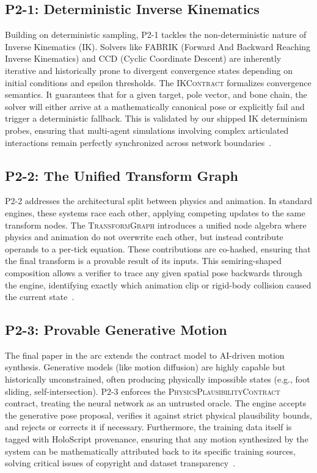 \documentclass[sigconf,nonacm]{acmart}
\newcommand{\ikcontract}{\textsc{IKContract}}
\newcommand{\transformgraph}{\textsc{TransformGraph}}
\newcommand{\plausibility}{\textsc{PhysicsPlausibilityContract}}
\begin{document}
\subsection{P2-1: Deterministic Inverse Kinematics}
Building on deterministic sampling, P2-1 tackles the non-deterministic nature of Inverse Kinematics (IK). Solvers like FABRIK (Forward And Backward Reaching Inverse Kinematics) and CCD (Cyclic Coordinate Descent) are inherently iterative and historically prone to divergent convergence states depending on initial conditions and epsilon thresholds. The \ikcontract{} formalizes convergence semantics. It guarantees that for a given target, pole vector, and bone chain, the solver will either arrive at a mathematically canonical pose or explicitly fail and trigger a deterministic fallback. This is validated by our shipped IK determinism probes, ensuring that multi-agent simulations involving complex articulated interactions remain perfectly synchronized across network boundaries~\cite{paper-7-ik-siggraph2027}.

\subsection{P2-2: The Unified Transform Graph}
P2-2 addresses the architectural split between physics and animation. In standard engines, these systems race each other, applying competing updates to the same transform nodes. The \transformgraph{} introduces a unified node algebra where physics and animation do not overwrite each other, but instead contribute operands to a per-tick equation. These contributions are co-hashed, ensuring that the final transform is a provable result of its inputs. This semiring-shaped composition allows a verifier to trace any given spatial pose backwards through the engine, identifying exactly which animation clip or rigid-body collision caused the current state~\cite{paper-8-unified-siggraph2027}.

\subsection{P2-3: Provable Generative Motion}
The final paper in the arc extends the contract model to AI-driven motion synthesis. Generative models (like motion diffusion) are highly capable but historically unconstrained, often producing physically impossible states (e.g., foot sliding, self-intersection). P2-3 enforces the \plausibility{} contract, treating the neural network as an untrusted oracle. The engine accepts the generative pose proposal, verifies it against strict physical plausibility bounds, and rejects or corrects it if necessary. Furthermore, the training data itself is tagged with HoloScript provenance, ensuring that any motion synthesized by the system can be mathematically attributed back to its specific training sources, solving critical issues of copyright and dataset transparency~\cite{paper-9-motion-asia2027}.
\end{document}
